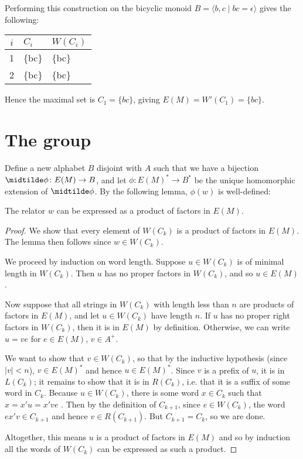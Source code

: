 \documentclass[11pt,libertine,widepage,nosubthm]{lmaths}
\begin{document}
\begin{example}
	Performing this construction on the bicyclic monoid $B = \langle b, c \mid bc = \epsilon \rangle$ gives the following:

	\begin{center}
	\begin{tabular}{c|ll}
		$i$ & $C_i$ & $W(C_i)$ \\
		\hline
		1 & \{bc\} & \{bc\} \\
		2 & \{bc\} & \{bc\}
	\end{tabular}
	\end{center}

	Hence the maximal set is $C_1 = \{bc\}$, giving $E(M) = W'(C_1) = \{ bc \}$.
\end{example}

\section{The group}
Define a new alphabet $B$ disjoint with $A$ such that we have a bijection $\midtilde\phi \colon E(M) \to B$, and let $\phi \colon E(M)^* \to B^*$ be the unique homomorphic extension of $\midtilde\phi$. By the following lemma, $\phi(w)$ is well-defined:

\begin{lemma} \label{lma:relator-factors-E(M)}
	The relator $w$ can be expressed as a product of factors in $E(M)$.
\end{lemma}
\begin{proof}
	\hspace{-0.25mm}We show that every element of $W(C_k)$ is a product of factors in $E(M)$. The lemma then follows since $w \in W(C_k)$.
	
	We proceed by induction on word length. Suppose $u \in W(C_k)$ is of minimal length in $W(C_k)$. Then $u$ has no proper factors in $W(C_k)$, and so $u \in E(M)$.

	Now suppose that all strings in $W(C_k)$ with length less than $n$ are products of factors in $E(M)$, and let $u \in W(C_k)$ have length $n$. If $u$ has no proper right factors in $W(C_k)$, then it is in $E(M)$ by definition. Otherwise, we can write $u = ve$ for $e \in E(M)$, $v \in A^+$.

	We want to show that $v \in W(C_k)$, so that by the inductive hypothesis (since $|v| < n$), $v \in E(M)^*$ and hence $u \in E(M)^*$. Since $v$ is a prefix of $u$, it is in $L(C_k)$; it remains to show that it is in $R(C_k)$, i.e. that it is a suffix of some word in $C_k$. Because $u \in W(C_k)$, there is some word $x \in C_k$ such that $x = x'u = x've$ . Then by the definition of $C_{k+1}$, since $e \in W(C_k)$, the word $ex'v \in C_{k+1}$ and hence $v \in R(C_{k+1})$. But $C_{k+1} = C_k$, so we are done.

	Altogether, this means $u$ is a product of factors in $E(M)$ and so by induction all the words of $W(C_k)$ can be expressed as such a product.
\end{proof}
\end{document}
